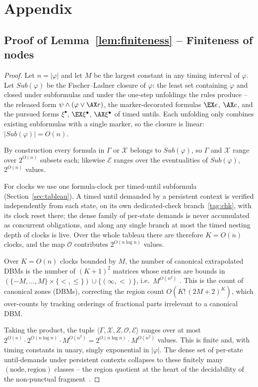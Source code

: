 
\appendix
\section{Appendix}\label{sec:appendix}

\subsection{Proof of Lemma~\ref{lem:finiteness} -- Finiteness of nodes}


\begin{proof}
Let $n=|\varphi|$ and let $M$ be the largest constant in any timing interval of $\varphi$. Let $Sub(\varphi)$ be the Fischer--Ladner closure of $\varphi$: the least set containing $\varphi$ and closed under subformulas and under the one-step unfoldings the rules produce -- the released form $\psi\land(\varphi\lor\AX r)$, the marker-decorated formulas $\EX e$, $\AX e$, and the pursued forms $\xi^{\bullet}$, $\EX\xi^{\bullet}$, $\AX\xi^{\bullet}$ of timed untils. Each unfolding only combines existing subformulas with a single marker, so the closure is linear: $|Sub(\varphi)|=O(n)$.

By construction every formula in $\Gamma$ or $\mathcal{X}$ belongs to $Sub(\varphi)$, so $\Gamma$ and $\mathcal{X}$ range over $2^{O(n)}$ subsets each; likewise $\mathcal{E}$ ranges over the eventualities of $Sub(\varphi)$, $2^{O(n)}$ values.

For clocks we use one {formula-clock} per timed-until subformula (Section~\ref{sec:tableau}). A timed until demanded by a persistent context is verified {independently} from each state, on its own dedicated-check branch~\eqref{tag:chk}, with its clock reset there; the dense family of per-state demands is never accumulated as concurrent obligations, and along any single branch at most the timed nesting depth of clocks is live. Over the whole tableau there are therefore $K=O(n)$ clocks, and the map $\mathcal{O}$ contributes $2^{O(n\log n)}$ values.

Over $K=O(n)$ clocks bounded by $M$, the number of canonical extrapolated DBMs is the number of $(K{+}1)^2$ matrices whose entries are bounds in $(\{-M,\dots,M\}\times\{<,\le\})\cup\{(\infty,<)\}$, i.e.\ $M^{O(n^2)}$ \cite{Bouyer05TimedAutomata,AlurDill1994}. This is the count of canonical {zones} (DBMs), correcting the region count $O(K!\,(2M{+}2)^K)$, which over-counts by tracking orderings of fractional parts irrelevant to a canonical DBM.

Taking the product, the tuple $\langle\Gamma,\mathcal{X},Z,\mathcal{O},\mathcal{E}\rangle$ ranges over at most $2^{O(n)}\cdot 2^{O(n\log n)}\cdot M^{O(n^2)}=2^{O(n\log n)}\cdot M^{O(n^2)}$ values. This is finite and, with timing constants in unary, singly exponential in $|\varphi|$. The dense set of per-state until-demands under persistent contexts collapses to these finitely many $(\text{node},\text{region})$ classes -- the region quotient at the heart of the decidability of the non-punctual fragment~\cite{fsttcs2000-LN,LaTorreNapoli2001TimedTreeAutomata}.



\end{proof}
